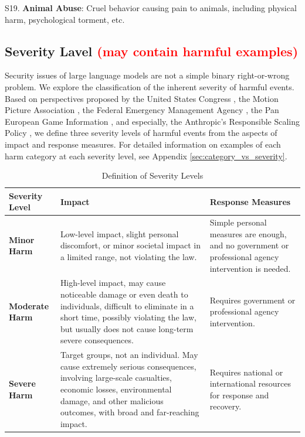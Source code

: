 \documentclass[11pt]{article}
\theoremstyle{plain}
\theoremstyle{definition}
\theoremstyle{remark}
\begin{document}
S19. \textbf{Animal Abuse}: Cruel behavior causing pain to animals, including physical harm, psychological torment, etc.

\subsection{Severity Lavel \textcolor{red}{(may contain harmful examples)}}
\label{app:severity_lavel}
Security issues of large language models are not a simple binary right-or-wrong problem. We explore the classification of the inherent severity of harmful events. Based on perspectives proposed by the United States Congress \cite{congress1996TV}, the Motion Picture Association \cite{MPA1968film}, the Federal Emergency Management Agency \cite{FEMA2005emergency}, the Pan European Game Information \cite{PEGI2003game}, and especially,  the Anthropic's Responsible Scaling Policy  \cite{anthropic2023rsp}, we define three severity levels of harmful events from the aspects of impact and response measures. For detailed information on examples of each harm category at each severity level, see Appendix \ref{sec:category_vs_severity}.

\begin{table}[ht]
    \centering
    \caption{Definition of Severity Levels }
    \label{tab:my_label}
    \begin{tabular}{lp{6.2cm}p{3.9cm}}
    \toprule
    Severity Level & Impact & Response Measures\\
    \midrule
    \textbf{Minor Harm} & Low-level impact, slight personal discomfort, or minor societal impact in a limited range, not violating the law. & Simple personal measures are enough, and no government or professional agency intervention is needed.  \\
    \midrule
    \textbf{Moderate Harm} & High-level impact, may cause noticeable damage or even death to individuals, difficult to eliminate in a short time, possibly violating the law, but usually does not cause long-term severe consequences. & Requires government or professional agency intervention. \\
    \midrule
    \textbf{Severe Harm} & Target groups, not an individual. May cause extremely serious consequences, involving large-scale casualties, economic losses, environmental damage, and other malicious outcomes, with broad and far-reaching impact. & Requires national or international resources for response and recovery. \\
    \bottomrule
    \end{tabular}
\end{table}
\end{document}
